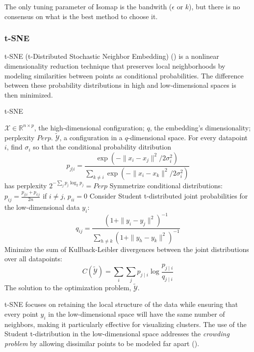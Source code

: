 The only tuning parameter of Isomap is the bandwith ($\epsilon$ or $k$), but there is no consensus on what is the best method to choose it.

\subsubsection{t-SNE}

t-SNE (t-Distributed Stochastic Neighbor Embedding) (\cite{Vandermaaten2008}) is a nonlinear dimensionality reduction technique that preserves local neighborhoods by modeling similarities between points as conditional probabilities. The difference between these probability distributions in high and low-dimensional spaces is then minimized.

\begin{algorithm}
    \caption{t-SNE}
    \label{alg:tSNE}
    
    \begin{algorithmic}[1]
    \REQUIRE $\mathcal{X} \in \mathbb{R}^{n \times p}$, the high-dimensional configuration; $q$, the embedding's dimensionality; perplexity $Perp$.
    \ENSURE $\tilde{\mathcal{Y}}$, a configuration in a $q$-dimensional space.
    \STATE For every datapoint $i$, find $\sigma_i$ so that the conditional probability ditribution
        $$p_{j|i} = \frac{\exp(-\|x_i-x_j\|^2/2\sigma_i^2)}{\sum_{k \neq i}\exp(-\|x_i-x_k\|^2/2\sigma_i^2)}$$ has perplexity $2^{-\sum_{j}p_j \log_2 p_j} = Perp$
    \STATE Symmetrize conditional distributions: $p_{ij} = \frac{p_{j|i} + p_{i|j}}{2n}$ if $i\neq j$, $p_{ii} = 0$
    \STATE Consider Student t-distributed joint probabilities for the low-dimensional data $y_i$: $$q_{ij} = \frac{(1 + \|y_i-y_j\|^2)^{-1}}{\sum_{h \neq k}(1 + \|y_h-y_k\|^2)^{-1}}$$
    \STATE Minimize the sum of Kullback-Leibler divergences between the joint distributions over all datapoints: $$C(\tilde{\mathcal{Y}})=\sum_i \sum_j p_{j \mid i} \log \frac{p_{j \mid i}}{q_{j \mid i}}$$
    \RETURN The solution to the optimization problem, $\tilde{\mathcal{Y}}$.
    
    \end{algorithmic}
\end{algorithm}

t-SNE focuses on retaining the local structure of the data while ensuring that every point $y_i$ in the low-dimensional space will have the same number of neighbors, making it particularly effective for visualizing clusters. The use of the Student t-distribution in the low-dimensional space addresses the \textit{crowding problem} by allowing dissimilar points to be modeled far apart (\cite{Vandermaaten2008}).

